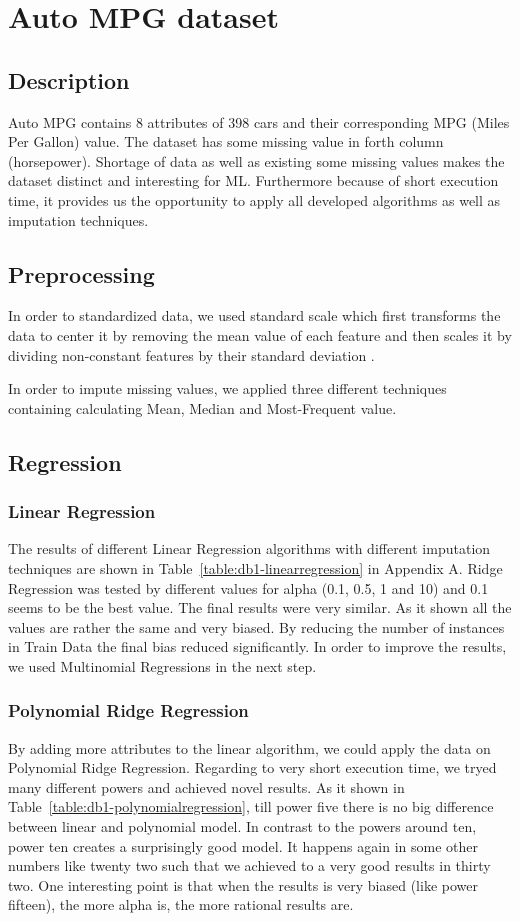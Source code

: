 \section{Auto MPG dataset}
\subsection{Description}
Auto MPG contains 8 attributes of 398 cars  and their corresponding MPG (Miles Per Gallon) value. The dataset has some missing value in forth column (horsepower). Shortage of data as well as existing some missing values makes the dataset distinct and interesting for ML. Furthermore because of short execution time, it provides us the opportunity to apply all developed algorithms as well as imputation techniques.

\subsection{Preprocessing}
In order to standardized data, we used standard scale which first transforms the data to center it by removing the mean value of each feature and then scales it by dividing non-constant features by their standard deviation \cite{scikitstandardization}.

In order to impute missing values, we applied three different techniques containing calculating Mean, Median and Most-Frequent value.

\subsection{Regression}
\subsubsection{Linear Regression}
The results of different Linear Regression algorithms with different imputation techniques are shown in Table~\ref{table:db1-linearregression} in Appendix A. Ridge Regression was tested by different values for alpha (0.1, 0.5, 1 and 10) and 0.1 seems to be the best value. The final results were very similar. As it shown all the values are rather the same and very biased. By reducing the number of instances in Train Data the final bias reduced significantly. In order to improve the results, we used Multinomial Regressions in the next step.

\subsubsection{Polynomial Ridge Regression}
By adding more attributes to the linear algorithm, we could apply the data on Polynomial Ridge Regression. Regarding to very short execution time, we tryed many different powers and achieved novel results. As it shown in Table~\ref{table:db1-polynomialregression}, till power five there is no big difference between linear and polynomial model. In contrast to the powers around ten, power ten creates a surprisingly good model. It happens again in some other numbers like twenty two such that we achieved to a very good results in thirty two. One interesting point is that when the results is very biased (like power fifteen), the more alpha is, the more rational results are.

